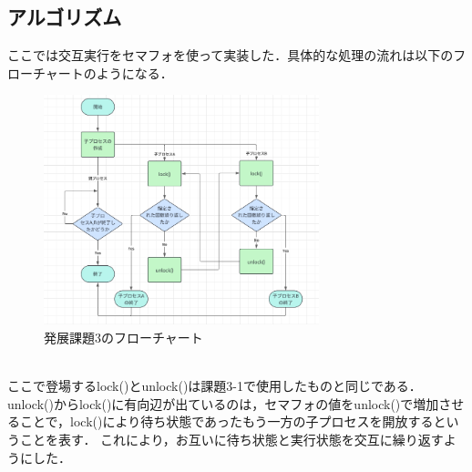\documentclass[dvipdfmx]{jarticle}
\begin{document}
\subsection{アルゴリズム}
ここでは交互実行をセマフォを使って実装した．具体的な処理の流れは以下のフローチャートのようになる．
\begin{figure}[h]
    \centering
    \includegraphics[width=8cm]{hatten3hurotya.png}
    \caption{発展課題3のフローチャート}
\end{figure}
\\ここで登場するlock()とunlock()は課題3-1で使用したものと同じである．unlock()からlock()に有向辺が出ているのは，セマフォの値をunlock()で増加させることで，lock()により待ち状態であったもう一方の子プロセスを開放するということを表す．
これにより，お互いに待ち状態と実行状態を交互に繰り返すようにした．
\end{document}
